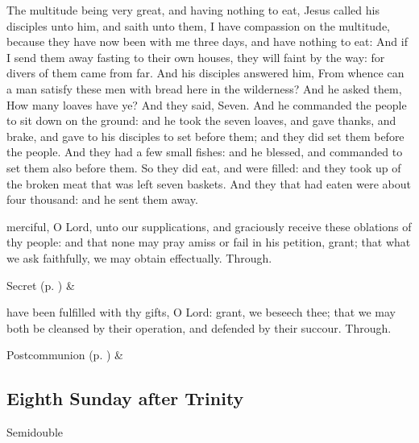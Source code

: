 \clearpage
{}
 The multitude being very great, and having nothing to eat, Jesus called his disciples unto him, and saith unto them, I have compassion on the multitude, because they have now been with me three days, and have nothing to eat: And if I send them away fasting to their own houses, they will faint by the way: for divers of them came from far. And his disciples answered him, From whence can a man satisfy these men with bread here in the wilderness? And he asked them, How many loaves have ye? And they said, Seven. And he commanded the people to sit down on the ground: and he took the seven loaves, and gave thanks, and brake, and gave to his disciples to set before them; and they did set them before the people. And they had a few small fishes: and he blessed, and commanded to set them also before them. So they did eat, and were filled: and they took up of the broken meat that was left seven baskets. And they that had eaten were about four thousand: and he sent them away.


\secret
{} merciful, O Lord, unto our supplications, and graciously receive these oblations of thy people: and that none may pray amiss or fail in his petition, grant; that what we ask faithfully, we may obtain effectually. Through.
\begin{rubric}
     Secret  (p. \pageref{SPSaints}) \&  
\end{rubric}


\postcommunion
{} have been fulfilled with thy gifts, O Lord: grant, we beseech thee; that we may both be cleansed by their operation, and defended by their succour. Through.
\begin{rubric}
     Postcommunion  (p. \pageref{SPSaints}) \&  
\end{rubric}


\clearpage
\subsection{Eighth Sunday after Trinity}
\begin{inhead}
    {Semidouble}
\end{inhead}


